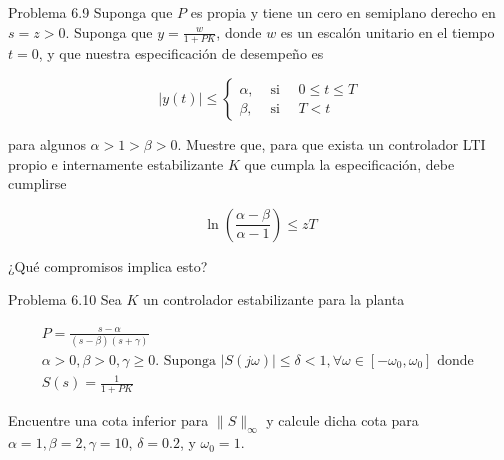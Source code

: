 Problema 6.9 Suponga que $P$ es propia y tiene un cero en semiplano derecho en $s=z>0$. Suponga que $y=\frac{w}{1+P K}$, donde $w$ es un escalón unitario en el tiempo $t=0$, y que nuestra especificación de desempeño es

$$
|y(t)| \leq \begin{cases}\alpha, & \text { si } \quad 0 \leq t \leq T \\ \beta, & \text { si } \quad T<t\end{cases}
$$

para algunos $\alpha>1>\beta>0$. Muestre que, para que exista un controlador LTI propio e internamente estabilizante $K$ que cumpla la especificación, debe cumplirse

$$
\ln \left(\frac{\alpha-\beta}{\alpha-1}\right) \leq z T
$$

¿Qué compromisos implica esto?

Problema 6.10 Sea $K$ un controlador estabilizante para la planta

$$
\begin{gathered}
P=\frac{s-\alpha}{(s-\beta)(s+\gamma)} \\
\alpha>0, \beta>0, \gamma \geq 0 . \text { Suponga }|S(j \omega)| \leq \delta<1, \forall \omega \in\left[-\omega_{0}, \omega_{0}\right] \text { donde } \\
S(s)=\frac{1}{1+P K}
\end{gathered}
$$

Encuentre una cota inferior para $\|S\|_{\infty}$ y calcule dicha cota para $\alpha=1, \beta=2, \gamma=10$, $\delta=0.2$, y $\omega_{0}=1$.
